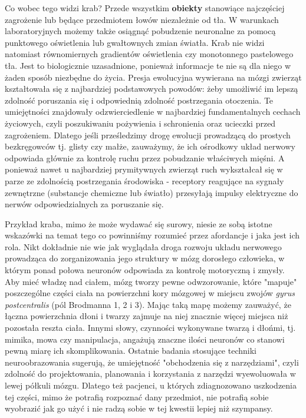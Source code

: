 \documentclass{article}
\begin{document}
Co wobec tego widzi krab? Przede wszystkim \textbf{obiekty} stanowiące najczęściej zagrożenie lub będące przedmiotem łowów niezależnie od tła. W warunkach laboratoryjnych możemy także osiągnąć pobudzenie neuronalne za pomocą punktowego oświetlenia lub gwałtownych zmian światła. Krab nie widzi natomiast równomiernych gradientów oświetlenia czy monotonnego pastelowego tła. Jest to biologicznie uzasadnione, ponieważ informacje te nie są dla niego w żaden sposób niezbędne do życia. Presja ewolucyjna wywierana na mózgi zwierząt kształtowała się z najbardziej podstawowych powodów: żeby umożliwić im lepszą zdolność poruszania się i odpowiednią zdolność postrzegania otoczenia. Te umiejętności znajdowały odzwierciedlenie w najbardziej fundamentalnych cechach życiowych, czyli poszukiwaniu pożywienia i schronienia oraz ucieczki przed zagrożeniem. Dlatego jeśli prześledzimy drogę ewolucji prowadzącą do prostych bezkręgowców tj. glisty czy małże, zauważymy, że ich ośrodkowy układ nerwowy odpowiada głównie za kontrolę ruchu przez pobudzanie właściwych mięśni. A ponieważ nawet u najbardziej prymitywnych zwierząt ruch wykształcał się w parze ze zdolnością postrzegania środowiska - receptory reagujące na sygnały zewnętrzne (substancje chemiczne lub światło) przesyłają impulsy elektryczne do nerwów odpowiedzialnych za poruszanie się. 

Przykład kraba, mimo że może wydawać się surowy, niesie ze sobą istotne wskazówki na temat tego co powinniśmy rozumieć przez afordancje i jaka jest ich rola. Nikt dokładnie nie wie jak wyglądała droga rozwoju układu nerwowego prowadząca do zorganizowania jego struktury w mózg dorosłego człowieka, w którym ponad połowa neuronów odpowiada za kontrolę motoryczną i zmysły. Aby mieć władzę nad ciałem, mózg tworzy pewne odwzorowanie, które "mapuje" poszczególne części ciała na powierzchni kory mózgowej w miejscu zwojów \emph{gyrus postcentralis} (pól Brodmanna 1, 2 i 3). Mając taką mapę możemy zauważyć, że łączna powierzchnia dłoni i twarzy zajmuje na niej znacznie więcej miejsca niż pozostała reszta ciała. Innymi słowy, czynności wykonywane twarzą i dłońmi, tj. mimika, mowa czy manipulacja, angażują znaczne ilości neuronów co stanowi pewną miarę ich skomplikowania. Ostatnie badania stosujące techniki neuroobrazowania sugerują, że umiejętność "obchodzenia się z narzędziami", czyli zdolność do projektowania, planowania i korzystania z narzędzi wyewoluowała w lewej półkuli mózgu. Dlatego też pacjenci, u których zdiagnozowano uszkodzenia tej części, mimo że potrafią rozpoznać dany przedmiot, nie potrafią sobie wyobrazić jak go użyć i nie radzą sobie w tej kwestii lepiej niż szympansy. 
\end{document}
